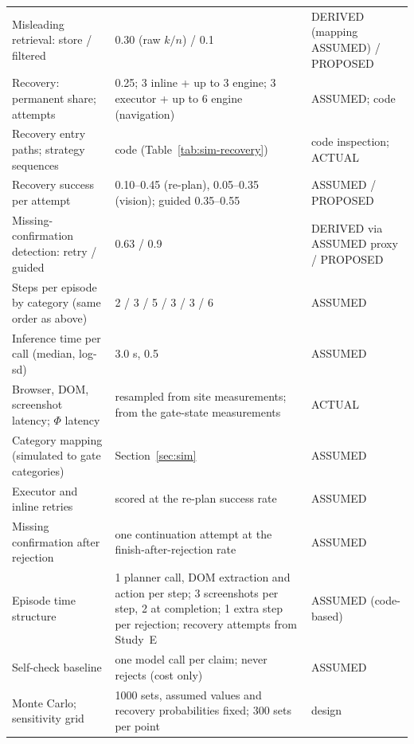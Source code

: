 \begin{table}[t]
\begin{tabular}{@{}p{6.2cm}p{8.4cm}p{2.6cm}@{}}
Misleading retrieval: store / filtered & 0.30 (raw $k/n$) / 0.1 & DERIVED (mapping ASSUMED) / PROPOSED \\
Recovery: permanent share; attempts & 0.25; 3 inline + up to 3 engine; 3 executor + up to 6 engine (navigation) & ASSUMED; code \\
Recovery entry paths; strategy sequences & code (Table~\ref{tab:sim-recovery}) & code inspection; ACTUAL \\
Recovery success per attempt & 0.10--0.45 (re-plan), 0.05--0.35 (vision); guided 0.35--0.55 & ASSUMED / PROPOSED \\
Missing-confirmation detection: retry / guided & 0.63 / 0.9 & DERIVED via ASSUMED proxy / PROPOSED \\
Steps per episode by category (same order as above) & 2 / 3 / 5 / 3 / 3 / 6 & ASSUMED \\
Inference time per call (median, log-sd) & 3.0 s, 0.5 & ASSUMED \\
Browser, DOM, screenshot latency; $\Phi$ latency & resampled from site measurements; from the gate-state measurements & ACTUAL \\
Category mapping (simulated to gate categories) & Section~\ref{sec:sim} & ASSUMED \\
Executor and inline retries & scored at the re-plan success rate & ASSUMED \\
Missing confirmation after rejection & one continuation attempt at the finish-after-rejection rate & ASSUMED \\
Episode time structure & 1 planner call, DOM extraction and action per step; 3 screenshots per step, 2 at completion; 1 extra step per rejection; recovery attempts from Study~E & ASSUMED (code-based) \\
Self-check baseline & one model call per claim; never rejects (cost only) & ASSUMED \\
Monte Carlo; sensitivity grid & 1000 sets, assumed values and recovery probabilities fixed; 300 sets per point & design \\
\bottomrule
\end{tabular}
\end{table}
